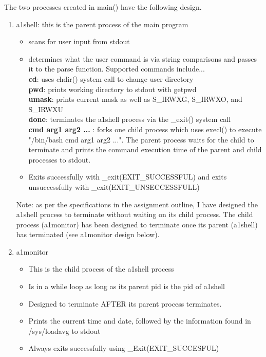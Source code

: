 \documentclass{article}
\begin{document}
\noindent
The two processes created in main() have the following design.
\begin{enumerate}
   \item a1shell: this is the parent process of the main program
   \begin{itemize}
     \item scans for user input from stdout
     \item determines what the user command is via string comparisons
       and passes it to the parse function. Supported commands include...\\

     \textbf{cd}: uses chdir() system call to change user directory \\
     \textbf{pwd}: prints working directory to stdout with getpwd\\
     \textbf{umask}: prints current mask as well as S\_IRWXG, S\_IRWXO, and S\_IRWXU\\
     \textbf{done}: terminates the a1shell process via the \_exit() system call \\
     \textbf{cmd arg1 arg2 ...} : forks one child process which uses execl() to execute
     "/bin/bash cmd arg1 arg2 ...". The parent process waits for the child to terminate 
     and prints the command execution time of the parent and child processes to 
     stdout. \\

     \item Exits successfully with \_exit(EXIT\_SUCCESSFUL) and exits unsuccessfully 
     with \_exit(EXIT\_UNSECCESSFULL)
   \end{itemize}

     Note: as per the specifications in the assignment outline, I have designed the a1shell
     process to terminate without waiting on its child process. The child process (a1monitor) has
     been designed to terminate once its parent (a1shell) has terminated (see a1monitor design
     below). \\
   \item a1monitor
   \begin{itemize}
     \item This is the child process of the a1shell process
     \item Is in a while loop as long as its parent pid is the pid of a1shell
     \item Designed to terminate AFTER its parent process terminates.
     \item Prints the current time and date, followed by the information found
     in /sys/loadavg to stdout
     \item Always exits successfully using \_Exit(EXIT\_SUCCESFUL) 
   \end{itemize}
\end{enumerate}
\end{document}

